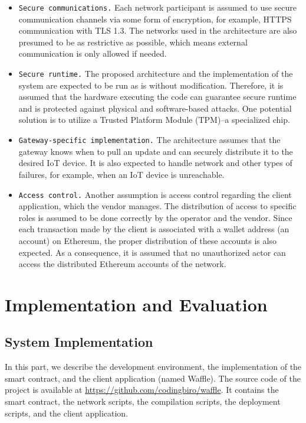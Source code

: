 \documentclass[conference]{IEEEtran}
\begin{document}
\begin{itemize}
\item \texttt{Secure communications.} Each network participant is assumed to use secure communication channels via some form of encryption, for example, HTTPS communication with TLS 1.3. The networks used in the architecture are also presumed to be as restrictive as possible, which means external communication is only allowed if needed.

\item \texttt{Secure runtime.} The proposed architecture and the implementation of the system are expected to be run as is without modification. Therefore, it is assumed that the hardware executing the code can guarantee secure runtime and is protected against physical and software-based attacks. One potential solution is to utilize a Trusted Platform Module (TPM)--a specialized chip. %

\item \texttt{Gateway-specific implementation.} The architecture assumes that the gateway knows when to pull an update and can securely distribute it to the desired IoT device. It is also expected to handle network and other types of failures, for example, when an IoT device is unreachable.

\item \texttt{Access control.} Another assumption is access control regarding the client application, which the vendor manages. The distribution of access to specific roles is assumed to be done correctly by the operator and the vendor. Since each transaction made by the client is associated with a wallet address (an account) on Ethereum, the proper distribution of these accounts is also expected. As a consequence, it is assumed that no unauthorized actor can access the distributed Ethereum accounts of the network.
\end{itemize}

\section{Implementation and Evaluation} \label{sec:4}

\subsection{System Implementation}
In this part, we describe the development environment, the implementation of the smart contract, and the client application (named Waffle).
The source code of the project is available at \url{https://github.com/codingbiro/waffle}. It contains the smart contract, the network scripts, the compilation scripts, the deployment scripts, and the client application.
\end{document}
